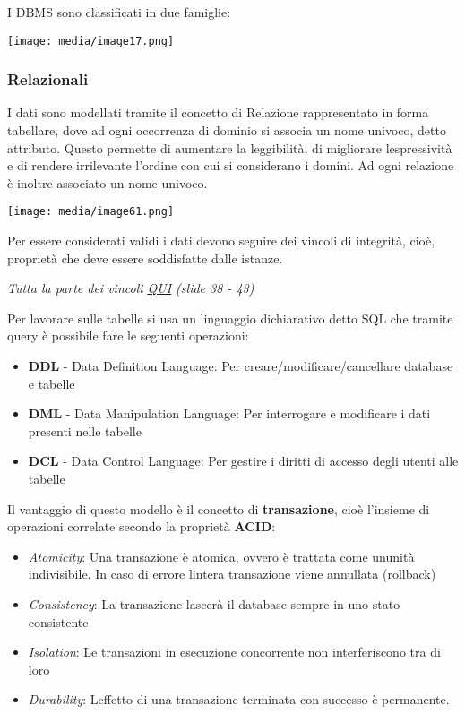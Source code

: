 I DBMS sono classificati in due famiglie:

\texttt{[image: media/image17.png]}

\subsubsection{Relazionali}\label{relazionali}

I dati sono modellati tramite il concetto di Relazione rappresentato in
forma tabellare, dove ad ogni occorrenza di dominio si associa un nome
univoco, detto attributo. Questo permette di aumentare la leggibilità,
di migliorare l\textquotesingle espressività e di rendere irrilevante
l'ordine con cui si considerano i domini. Ad ogni relazione è inoltre
associato un nome univoco.

\texttt{[image: media/image61.png]}

Per essere considerati validi i dati devono seguire dei vincoli di
integrità, cioè, proprietà che deve essere soddisfatte dalle istanze.

\emph{Tutta la parte dei vincoli
\href{https://virtuale.unibo.it/pluginfile.php/2015119/mod_resource/content/1/Lezione\%203\%20-\%20Storage\%20dei\%20dati.pdf}{\ul{QUI}}
(slide 38 - 43)}

Per lavorare sulle tabelle si usa un linguaggio dichiarativo detto SQL
che tramite query è possibile fare le seguenti operazioni:

\begin{itemize}
\item
  \textbf{DDL} - Data Definition Language: Per
  creare/modificare/cancellare database e tabelle
\item
  \textbf{DML} - Data Manipulation Language: Per interrogare e
  modificare i dati presenti nelle tabelle
\item
  \textbf{DCL} - Data Control Language: Per gestire i diritti di accesso
  degli utenti alle tabelle
\end{itemize}

Il vantaggio di questo modello è il concetto di \textbf{transazione},
cioè l'insieme di operazioni correlate secondo la proprietà
\textbf{ACID}:

\begin{itemize}
\item
  \emph{Atomicity}: Una transazione è atomica, ovvero è trattata come
  un\textquotesingle unità indivisibile. In caso di errore
  l\textquotesingle intera transazione viene annullata (rollback)
\item
  \emph{Consistency}: La transazione lascerà il database sempre in uno
  stato consistente
\item
  \emph{Isolation}: Le transazioni in esecuzione concorrente non
  interferiscono tra di loro
\item
  \emph{Durability}: L\textquotesingle effetto di una transazione
  terminata con successo è permanente.
\end{itemize}


